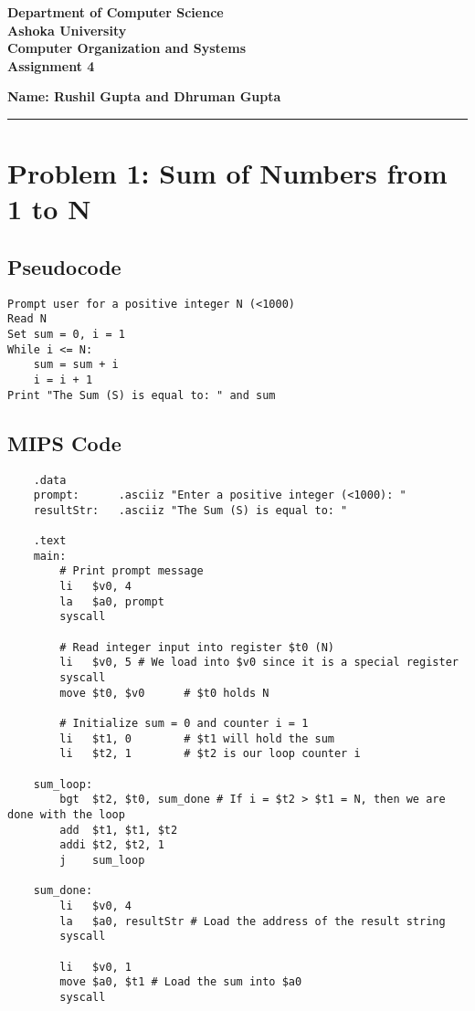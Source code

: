 \documentclass[a4paper]{article}
\begin{document}
\begin{center}
{\large \bf \color{red}  Department of Computer Science} \\
{\large \bf \color{red}  Ashoka University} \\[0.1in]
{\large \bf \color{blue} Computer Organization and Systems} \\[0.05in]
{\bf \color{YellowOrange} Assignment 4}
\end{center}
\medskip

{\hfill {\textbf{Name: Rushil Gupta and Dhruman Gupta} } }

\bigskip
\hrule

\section*{Problem 1: Sum of Numbers from 1 to N}
\subsection*{Pseudocode}
\begin{verbatim}
Prompt user for a positive integer N (<1000)
Read N
Set sum = 0, i = 1
While i <= N:
    sum = sum + i
    i = i + 1
Print "The Sum (S) is equal to: " and sum
\end{verbatim}

\subsection*{MIPS Code}
\begin{verbatim}
    .data
    prompt:      .asciiz "Enter a positive integer (<1000): "
    resultStr:   .asciiz "The Sum (S) is equal to: "
    
    .text
    main:
        # Print prompt message
        li   $v0, 4
        la   $a0, prompt
        syscall
    
        # Read integer input into register $t0 (N)
        li   $v0, 5 # We load into $v0 since it is a special register
        syscall
        move $t0, $v0      # $t0 holds N
    
        # Initialize sum = 0 and counter i = 1
        li   $t1, 0        # $t1 will hold the sum
        li   $t2, 1        # $t2 is our loop counter i
    
    sum_loop:
        bgt  $t2, $t0, sum_done # If i = $t2 > $t1 = N, then we are done with the loop
        add  $t1, $t1, $t2
        addi $t2, $t2, 1
        j    sum_loop
    
    sum_done:
        li   $v0, 4
        la   $a0, resultStr # Load the address of the result string
        syscall
    
        li   $v0, 1
        move $a0, $t1 # Load the sum into $a0
        syscall    
\end{verbatim}
\end{document}
